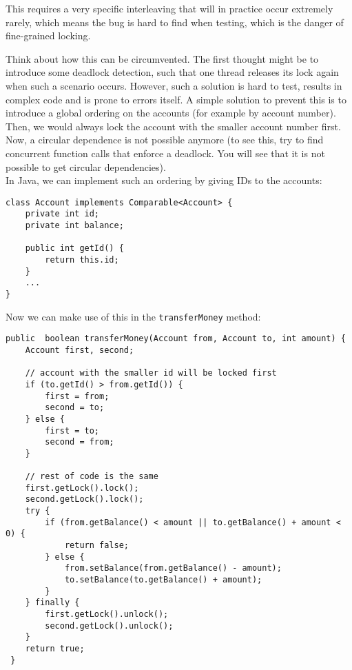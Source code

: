 \documentclass[main.tex]{subfiles}
\begin{document}
\noindent This requires a very specific interleaving that will in practice occur extremely rarely, which means the bug is hard to find when testing, which is the danger of fine-grained locking.

Think about how this can be circumvented. The first thought might be to introduce some deadlock detection, such that one thread releases its lock again when such a scenario occurs. However, such a solution is hard to test, results in complex code and is prone to errors itself. A simple solution to prevent this is to introduce a global ordering on the accounts (for example by account number). Then, we would always lock the account with the smaller account number first. Now, a circular dependence is not possible anymore (to see this, try to find concurrent function calls that enforce a deadlock. You will see that it is not possible to get circular dependencies).\\
In Java, we can implement such an ordering by giving IDs to the accounts:

\newpage

\begin{verbatim}
class Account implements Comparable<Account> {
    private int id;
    private int balance;

    public int getId() {
        return this.id;
    }
    ...
}
\end{verbatim}

\noindent Now we can make use of this in the \texttt{transferMoney} method:

\begin{verbatim}
public  boolean transferMoney(Account from, Account to, int amount) {
    Account first, second;

    // account with the smaller id will be locked first
    if (to.getId() > from.getId()) {
        first = from;
        second = to;
    } else {
        first = to;
        second = from;
    }

    // rest of code is the same
    first.getLock().lock();
    second.getLock().lock();
    try {
        if (from.getBalance() < amount || to.getBalance() + amount < 0) {
            return false;
        } else {
            from.setBalance(from.getBalance() - amount);
            to.setBalance(to.getBalance() + amount);
        }
    } finally {
        first.getLock().unlock();
        second.getLock().unlock();
    }
    return true;
 }

\end{verbatim}
\end{document}
